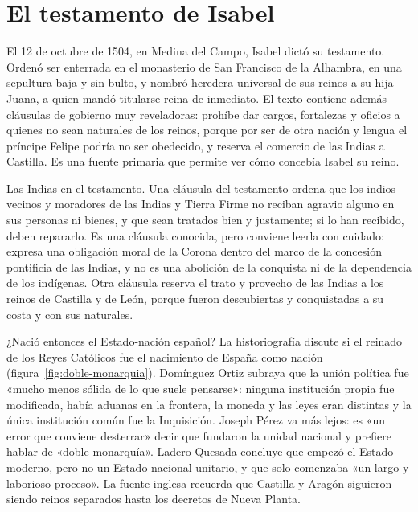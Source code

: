 \documentclass{book}
\begin{document}

\section{El testamento de Isabel}

El 12 de octubre de 1504, en Medina del Campo, Isabel dictó su testamento. Ordenó ser enterrada en el monasterio de San Francisco de la Alhambra, en una sepultura baja y sin bulto, y nombró heredera universal de sus reinos a su hija Juana, a quien mandó titularse reina de inmediato. El texto contiene además cláusulas de gobierno muy reveladoras: prohíbe dar cargos, fortalezas y oficios a quienes no sean naturales de los reinos, porque por ser de otra nación y lengua el príncipe Felipe podría no ser obedecido, y reserva el comercio de las Indias a Castilla. Es una fuente primaria que permite ver cómo concebía Isabel su reino.


Las Indias en el testamento. Una cláusula del testamento ordena que los indios vecinos y moradores de las Indias y Tierra Firme no reciban agravio alguno en sus personas ni bienes, y que sean tratados bien y justamente; si lo han recibido, deben repararlo. Es una cláusula conocida, pero conviene leerla con cuidado: expresa una obligación moral de la Corona dentro del marco de la concesión pontificia de las Indias, y no es una abolición de la conquista ni de la dependencia de los indígenas. Otra cláusula reserva el trato y provecho de las Indias a los reinos de Castilla y de León, porque fueron descubiertas y conquistadas a su costa y con sus naturales.


¿Nació entonces el Estado-nación español?
La historiografía discute si el reinado de los Reyes Católicos fue el nacimiento de España como nación (figura~\ref{fig:doble-monarquia}). Domínguez Ortiz subraya que la unión política fue «mucho menos sólida de lo que suele pensarse»: ninguna institución propia fue modificada, había aduanas en la frontera, la moneda y las leyes eran distintas y la única institución común fue la Inquisición. Joseph Pérez va más lejos: es «un error que conviene desterrar» decir que fundaron la unidad nacional y prefiere hablar de «doble monarquía». Ladero Quesada concluye que empezó el Estado moderno, pero no un Estado nacional unitario, y que solo comenzaba «un largo y laborioso proceso». La fuente inglesa recuerda que Castilla y Aragón siguieron siendo reinos separados hasta los decretos de Nueva Planta.
\end{document}
